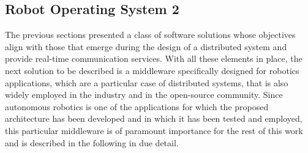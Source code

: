 \subsection{Robot Operating System 2}
\label{sec:ros2}
The previous sections presented a class of software solutions whose objectives align with those that emerge during the design of a distributed system and provide real-time communication services. With all these elements in place, the next solution to be described is a middleware specifically designed for robotics applications, which are a particular case of distributed systems, that is also widely employed in the industry and in the open-source community. Since autonomous robotics is one of the applications for which the proposed architecture has been developed and in which it has been tested and employed, this particular middleware is of paramount importance for the rest of this work and is described in the following in due detail.

